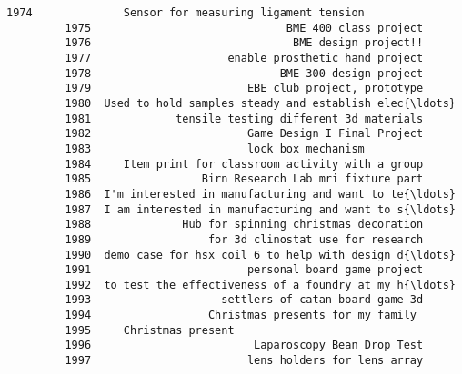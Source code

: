 \documentclass[11pt]{article}
\begin{document}
\begin{Verbatim}[commandchars=\\\{\}]
         1974              Sensor for measuring ligament tension   
         1975                              BME 400 class project   
         1976                               BME design project!!   
         1977                     enable prosthetic hand project   
         1978                             BME 300 design project   
         1979                        EBE club project, prototype   
         1980  Used to hold samples steady and establish elec{\ldots}   
         1981             tensile testing different 3d materials   
         1982                        Game Design I Final Project   
         1983                        lock box mechanism            
         1984     Item print for classroom activity with a group   
         1985                 Birn Research Lab mri fixture part   
         1986  I'm interested in manufacturing and want to te{\ldots}   
         1987  I am interested in manufacturing and want to s{\ldots}   
         1988              Hub for spinning christmas decoration   
         1989                  for 3d clinostat use for research   
         1990  demo case for hsx coil 6 to help with design d{\ldots}   
         1991                        personal board game project   
         1992  to test the effectiveness of a foundry at my h{\ldots}   
         1993                    settlers of catan board game 3d   
         1994                  Christmas presents for my family    
         1995     Christmas present                                
         1996                         Laparoscopy Bean Drop Test   
         1997                        lens holders for lens array   
         

\end{Verbatim}
\end{document}
